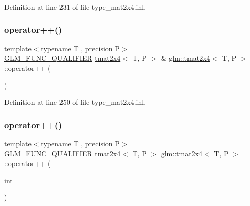 Definition at line 231 of file type\+\_\+mat2x4.\+inl.

\mbox{\label{structglm_1_1tmat2x4_a3cee5fba0b07ed5708aeea6b2d6fcf46}} 
\subsubsection{\texorpdfstring{operator++()}{operator++()}\hspace{0.1cm}{\footnotesize\ttfamily [1/2]}}
{\footnotesize\ttfamily template$<$typename T , precision P$>$ \\
\mbox{\hyperlink{setup_8hpp_a33fdea6f91c5f834105f7415e2a64407}{G\+L\+M\+\_\+\+F\+U\+N\+C\+\_\+\+Q\+U\+A\+L\+I\+F\+I\+ER}} \mbox{\hyperlink{structglm_1_1tmat2x4}{tmat2x4}}$<$ T, P $>$ \& \mbox{\hyperlink{structglm_1_1tmat2x4}{glm\+::tmat2x4}}$<$ T, P $>$\+::operator++ (\begin{DoxyParamCaption}{ }\end{DoxyParamCaption})}



Definition at line 250 of file type\+\_\+mat2x4.\+inl.

\mbox{\label{structglm_1_1tmat2x4_a721945e0fb3653040ed9b68a65288a6c}} 
\subsubsection{\texorpdfstring{operator++()}{operator++()}\hspace{0.1cm}{\footnotesize\ttfamily [2/2]}}
{\footnotesize\ttfamily template$<$typename T , precision P$>$ \\
\mbox{\hyperlink{setup_8hpp_a33fdea6f91c5f834105f7415e2a64407}{G\+L\+M\+\_\+\+F\+U\+N\+C\+\_\+\+Q\+U\+A\+L\+I\+F\+I\+ER}} \mbox{\hyperlink{structglm_1_1tmat2x4}{tmat2x4}}$<$ T, P $>$ \mbox{\hyperlink{structglm_1_1tmat2x4}{glm\+::tmat2x4}}$<$ T, P $>$\+::operator++ (\begin{DoxyParamCaption}\item[{int}]{ }\end{DoxyParamCaption})}



